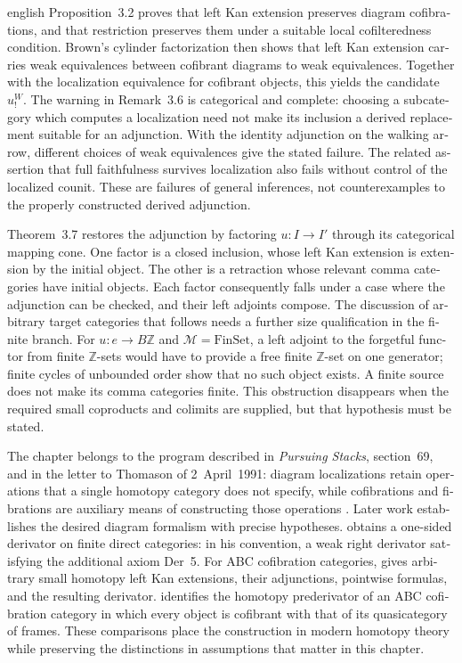 \begin{otherlanguage}{english}
\begin{otherlanguage*}{english}
Proposition~3.2 proves that left Kan extension preserves diagram cofibrations, and that restriction preserves them under a suitable local cofilteredness condition. Brown's cylinder factorization then shows that left Kan extension carries weak equivalences between cofibrant diagrams to weak equivalences. Together with the localization equivalence for cofibrant objects, this yields the candidate $u_!^W$. The warning in Remark~3.6 is categorical and complete: choosing a subcategory which computes a localization need not make its inclusion a derived replacement suitable for an adjunction. With the identity adjunction on the walking arrow, different choices of weak equivalences give the stated failure. The related assertion that full faithfulness survives localization also fails without control of the localized counit. These are failures of general inferences, not counterexamples to the properly constructed derived adjunction.

Theorem~3.7 restores the adjunction by factoring $u:I\to I'$ through its categorical mapping cone. One factor is a closed inclusion, whose left Kan extension is extension by the initial object. The other is a retraction whose relevant comma categories have initial objects. Each factor consequently falls under a case where the adjunction can be checked, and their left adjoints compose. The discussion of arbitrary target categories that follows needs a further size qualification in the finite branch. For $u:e\to B\mathbb Z$ and $\mathcal M=\mathrm{FinSet}$, a left adjoint to the forgetful functor from finite $\mathbb Z$-sets would have to provide a free finite $\mathbb Z$-set on one generator; finite cycles of unbounded order show that no such object exists. A finite source does not make its comma categories finite. This obstruction disappears when the required small coproducts and colimits are supplied, but that hypothesis must be stated.

The chapter belongs to the program described in \emph{Pursuing Stacks}, section~69, and in the letter to Thomason of 2~April~1991: diagram localizations retain operations that a single homotopy category does not specify, while cofibrations and fibrations are auxiliary means of constructing those operations \citep{Grothendieck1983,Grothendieck1991Letter}. Later work establishes the desired diagram formalism with precise hypotheses. \citet[Corollary~2.24]{Cisinski2010} obtains a one-sided derivator on finite direct categories: in his convention, a weak right derivator satisfying the additional axiom Der~5. For ABC cofibration categories, \citet[Theorems~9.6.3, 9.6.5, and 10.3.2]{RadulescuBanu2009} gives arbitrary small homotopy left Kan extensions, their adjunctions, pointwise formulas, and the resulting derivator. \citet[Theorem~3.33]{Lenz2018} identifies the homotopy prederivator of an ABC cofibration category in which every object is cofibrant with that of its quasicategory of frames. These comparisons place the construction in modern homotopy theory while preserving the distinctions in assumptions that matter in this chapter.


\end{otherlanguage*}
\end{otherlanguage}
